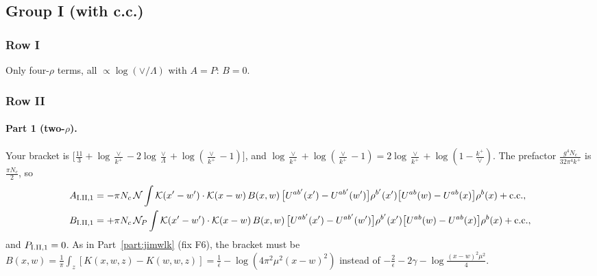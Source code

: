 \documentclass[10pt]{article}
\numberwithin{equation}{section}
\newcommand{\KK}{\mathcal K}
\newcommand{\NN}{\mathcal N}
\newcommand{\NP}{\mathcal N_{P}}
\begin{document}
\subsection{Group I (with c.c.)}
\subsubsection{Row I}
Only four-$\rho$ terms, all $\propto\log(\vee/\Lambda)$ with $A=P$: \textbf{$B=0$}.

\subsubsection{Row II}\label{B:sec:I.II}
\paragraph{Part 1 (two-$\rho$).} Your bracket is $\big[\frac{11}{3}+\log\frac{\vee}{k^+}-2\log\frac{\vee}{\Lambda}+\log(\frac{\vee}{k^+}-1)\big]$, and $\log\frac{\vee}{k^+}+\log(\frac{\vee}{k^+}-1)=2\log\frac{\vee}{k^+}+\log(1-\frac{k^+}{\vee})$. The prefactor $\frac{g^4N_c}{32\pi^4k^+}$ is $\frac{\pi N_c}{2}$, so
\begin{align}
A_{\rm I.II,1}&=-\pi N_c\,\NN\int\KK(x'-w')\cdot\KK(x-w)\,B(x,w)\,\big[U^{ab'}(x')-U^{ab'}(w')\big]\rho^{b'}(x')\big[U^{ab}(w)-U^{ab}(x)\big]\rho^b(x)+{\rm c.c.},\notag\\
B_{\rm I.II,1}&=+\pi N_c\,\NP\int\KK(x'-w')\cdot\KK(x-w)\,B(x,w)\,\big[U^{ab'}(x')-U^{ab'}(w')\big]\rho^{b'}(x')\big[U^{ab}(w)-U^{ab}(x)\big]\rho^b(x)+{\rm c.c.},
\end{align}
and $P_{\rm I.II,1}=0$. As in Part~\ref{part:jimwlk} (fix F6), the bracket must be $B(x,w)=\frac1\pi\int_z[K(x,w,z)-K(w,w,z)]=\frac1{\bar\epsilon}-\log(4\pi^2\mu^2(x-w)^2)$ instead of $-\frac2\epsilon-2\gamma-\log\frac{(x-w)^2\mu^2}{4}$.
\end{document}
